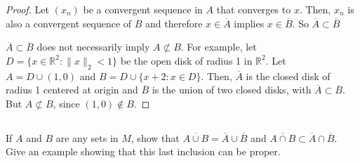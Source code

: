 \begin{proof}

Let $(x_n)$ be a convergent sequence in $A$ that converges to $x$. Then, $x_n$ is also a convergent sequence of $B$ and therefore $x \in \overline{A}$ implies $x \in \overline{B}$. So $\overline{A} \subset \overline{B}$


$\overline{A} \subset \overline{B}$ does not necessarily imply $A \not\subset B$. For example, let $D = \{x \in \mathbb{R}^2 : \|x\|_2 < 1\}$ be the open disk of radius 1 in $\mathbb{R}^2$. Let $A = D \cup {(1,0)}$ and $B = D \cup \{x + 2 : x \in D\}$. Then, $\overline{A}$ is the closed disk of radius 1 centered at origin and $\overline{B}$ is the union of two closed disks, with $\overline{A} \subset \overline{B}$. But $A \not\subset B$, since $(1,0) \notin B$.

\end{proof}

\subsection{} If $A$ and $B$ are any sets in $M$, show that $\overline{A \cup B} = \overline{A} \cup \overline{B}$ and $\overline{A \cap B} \subset \overline{A} \cap \overline{B}$. Give an example showing that this last inclusion can be proper.

